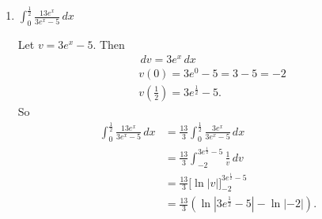 \documentclass[nooutcomes, handout]{ximera}
\renewcommand{\d}{\,d}
\newcommand{\eval}[1]{\bigg[ #1 \bigg]}
\begin{document}
\begin{problem}
\begin{enumerate}
		
		
	\item  $\int_0^{\frac{1}{2}} \frac{13e^x}{3e^x - 5} \d x$
		\begin{freeResponse}
		Let $v=3e^x - 5$.  Then
			\begin{align*}
			&\d v = 3e^x \d x  \\
			&v(0) = 3e^0 -5= 3-5=-2  \\
			&v\left( \frac{1}{2} \right) = 3e^{\frac{1}{2}} - 5.
			\end{align*}
		So
			\begin{align*}
			\int_0^{\frac{1}{2}} \frac{13e^x}{3e^x - 5} \d x &= \frac{13}{3} \int_0^{\frac{1}{2}} \frac{3e^x}{3e^x - 5} \d x  \\
			&= \frac{13}{3} \int_{-2}^{3e^{\frac{1}{2}}-5} \frac{1}{v} \d v  \\
			&= \frac{13}{3} \eval{\ln|v|}_{-2}^{3e^{\frac{1}{2}}-5}  \\
			&= \frac{13}{3} \left( \ln|3e^{\frac{1}{2}}-5| - \ln|-2| \right).  \\
			\end{align*}
		\end{freeResponse}
		
		
		
	\end{enumerate}
			
			
	
\end{problem}
\end{document}
